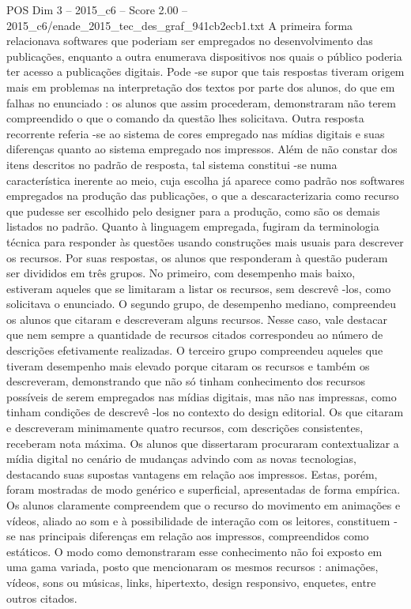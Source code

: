\begin{textsample}{POS Dim 3 – 2015\_c6 – Score 2.00 – 2015\_c6/enade\_2015\_tec\_des\_graf\_941cb2ecb1.txt}
A primeira forma relacionava softwares que poderiam ser empregados no desenvolvimento das publicações, enquanto a outra enumerava dispositivos nos quais o público poderia ter acesso a publicações digitais.
Pode -se supor que tais respostas tiveram origem mais em problemas na interpretação dos textos por parte dos alunos, do que em falhas no enunciado : os alunos que assim procederam, demonstraram não terem compreendido o que o comando da questão lhes solicitava.
Outra resposta recorrente referia -se ao sistema de cores empregado nas mídias digitais e suas diferenças quanto ao sistema empregado nos impressos.
Além de não constar dos itens descritos no padrão de resposta, tal sistema constitui -se numa característica inerente ao meio, cuja escolha já aparece como padrão nos softwares empregados na produção das publicações, o que a descaracterizaria como recurso que pudesse ser escolhido pelo designer para a produção, como são os demais listados no padrão.
Quanto à linguagem empregada, fugiram da terminologia técnica para responder às questões usando construções mais usuais para descrever os recursos.
Por suas respostas, os alunos que responderam à questão puderam ser divididos em três grupos.
No primeiro, com desempenho mais baixo, estiveram aqueles que se limitaram a listar os recursos, sem descrevê -los, como solicitava o enunciado.
O segundo grupo, de desempenho mediano, compreendeu os alunos que citaram e descreveram alguns recursos.
Nesse caso, vale destacar que nem sempre a quantidade de recursos citados correspondeu ao número de descrições efetivamente realizadas.
O terceiro grupo compreendeu aqueles que tiveram desempenho mais elevado porque citaram os recursos e também os descreveram, demonstrando que não só tinham conhecimento dos recursos possíveis de serem empregados nas mídias digitais, mas não nas impressas, como tinham condições de descrevê -los no contexto do design editorial.
Os que citaram e descreveram minimamente quatro recursos, com descrições consistentes, receberam nota máxima.
Os alunos que dissertaram procuraram contextualizar a mídia digital no cenário de mudanças advindo com as novas tecnologias, destacando suas supostas vantagens em relação aos impressos.
Estas, porém, foram mostradas de modo genérico e superficial, apresentadas de forma empírica.
Os alunos claramente compreendem que o recurso do movimento em animações e vídeos, aliado ao som e à possibilidade de interação com os leitores, constituem -se nas principais diferenças em relação aos impressos, compreendidos como estáticos.
O modo como demonstraram esse conhecimento não foi exposto em uma gama variada, posto que mencionaram os mesmos recursos : animações, vídeos, sons ou músicas, links, hipertexto, design responsivo, enquetes, entre outros citados.

\end{textsample}
